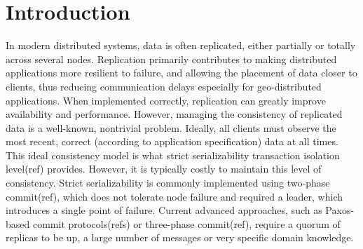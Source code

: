 

\section{Introduction}


In modern distributed systems, data is often replicated, either partially or totally 
across several nodes. Replication primarily contributes to making distributed 
applications more resilient to failure, and allowing the placement of data closer to clients, 
thus reducing communication delays especially for geo-distributed applications. 
When implemented correctly, replication can greatly improve availability and performance.
However, managing the consistency of replicated data is a well-known, nontrivial
problem. Ideally, all clients must observe the most recent, correct (according to
application specification) data at all times. This ideal consistency model is what
strict serializability transaction isolation level(ref) provides. However, it
is typically costly to maintain this level of consistency. Strict
serializability is commonly implemented using two-phase commit(ref), which does not
tolerate node failure and required a leader, which introduces a single point of
failure. Current advanced approaches, such as Paxos-based commit protocols(refs) or three-phase commit(ref),
require a quorum of replicas to be up, a large number of messages or very
specific domain knowledge. \\  %

